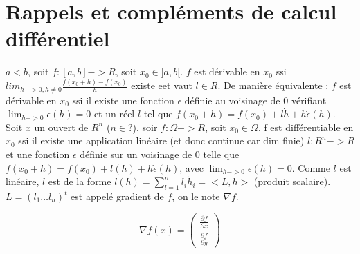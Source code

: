 	\section{Rappels et compléments de calcul différentiel}
	
	$a<b$, soit $f:[a, b]->R$, soit $x_0 \in ]a, b[$.
	$f$ est dérivable en $x_0$ ssi $lim_{h->0, h\neq 0} \frac{ f(x_0+h)-f(x_0) }{ h }$ existe eet vaut $l \in R$.
	De manière équivalente : $f$ est dérivable en $x_0$ ssi il existe une fonction $\epsilon$ définie au voisinage de $0$ vérifiant $\lim_{h->0} \epsilon (h) = 0$ et un réel $l$ tel que $f(x_0+h) = f(x_0)+l\dot h + h \dot \epsilon (h)$.
	Soit $x$ un ouvert de $R^n$ ($n \in ?$), soir $f:\Omega ->R$, soit $x_0 \in \Omega$, f est différentiable en $x_0$ ssi il existe une application linéaire (et donc continue car dim finie) $l:R^n->R$ et une fonction $\epsilon$ définie sur un voisinage de $0$ telle que $f(x_0+h) = f(x_0)+l(h) + h \dot \epsilon (h)$, avec $\lim_{h->0} \epsilon (h) = 0$.
	Comme $l$ est linéaire, $l$ est de la forme $l(h) = \sum _{l=1}^n l_i \dot h_i = <L,h>$ (produit scalaire). 
	$L= ( l_1 \dots l_n )^t$ 
	est appelé gradient de $f$, on le note $\nabla f$.
	
	\[\nabla f(x) = \left( \begin{array}{c} \frac{\partial f}{\partial x} \\ \frac{\partial f}{\partial y} \end{array}\right)\]
	
